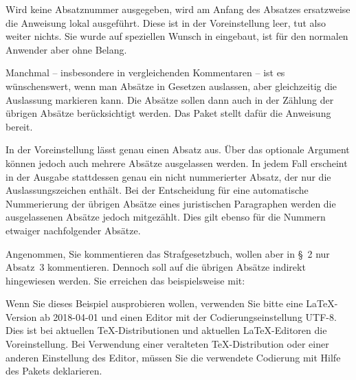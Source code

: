 \begin{Declaration}
\end{Declaration}
Wird keine Absatznummer ausgegeben, wird am Anfang des Absatzes ersatzweise
die Anweisung  lokal
ausgeführt. Diese ist in der Voreinstellung leer, tut
also weiter nichts. Sie wurde auf speziellen Wunsch in 
eingebaut, ist für den normalen Anwender aber ohne Belang.%
\EndIndexGroup


\begin{Declaration}
\end{Declaration}
Manchmal -- insbesondere in vergleichenden
Kommentaren -- ist es wünschenswert, wenn man Absätze in Gesetzen auslassen,
aber gleichzeitig die Auslassung markieren kann. Die
Absätze sollen dann auch in der Zählung der übrigen Absätze berücksichtigt
werden. Das Paket  stellt dafür die Anweisung
 bereit. 

In der Voreinstellung lässt  genau
einen Absatz aus. Über das optionale Argument  können jedoch
auch mehrere Absätze ausgelassen werden. In jedem Fall erscheint in der
Ausgabe stattdessen genau ein nicht nummerierter Absatz, der nur die
Auslassungszeichen  enthält. Bei der Entscheidung für eine
automatische Nummerierung der übrigen Absätze eines juristischen Paragraphen
werden die ausgelassenen Absätze jedoch mitgezählt. Dies gilt ebenso für die
Nummern etwaiger nachfolgender Absätze.
\begin{Example}
  Angenommen, Sie kommentieren das Strafgesetzbuch, wollen aber in \S~2 nur
  Absatz~3 kommentieren. Dennoch soll auf die übrigen Absätze indirekt
  hingewiesen werden. Sie erreichen das beispielsweise mit:
  Wenn Sie dieses Beispiel ausprobieren wollen, verwenden
  Sie bitte eine \LaTeX-Version ab 2018-04-01 und einen Editor mit der
  Codierungseinstellung UTF-8. Dies ist bei aktuellen \TeX-Distributionen und
  aktuellen \LaTeX-Editoren die Voreinstellung. Bei Verwendung einer
  veralteten \TeX-Distribution oder einer anderen Einstellung des Editor,
  müssen Sie die verwendete Codierung mit Hilfe des Pakets
   deklarieren.%
\end{Example}

